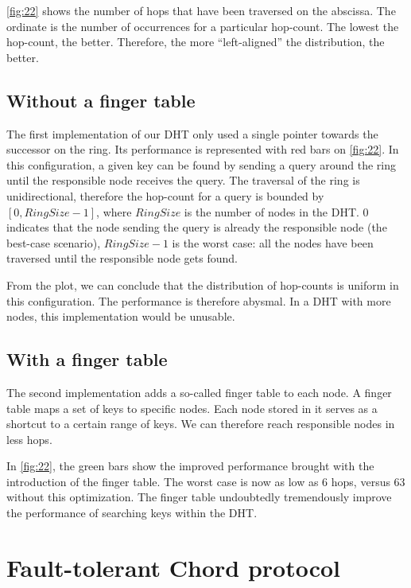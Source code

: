 \documentclass[11pt,a4paper,parskip=half]{scrartcl}
\begin{document}
\autoref{fig:22} shows the number of hops that have been traversed on the abscissa.
The ordinate is the number of occurrences for a particular hop-count.
The lowest the hop-count, the better.
Therefore, the more \enquote{left-aligned} the distribution, the better.

\subsection{Without a finger table}

The first implementation of our DHT only used a single pointer towards the successor on the ring.
Its performance is represented with red bars on \autoref{fig:22}.
In this configuration, a given key can be found by sending a query around the ring until the responsible node receives the query.
The traversal of the ring is unidirectional, therefore the hop-count for a query is bounded by $\left[0,RingSize-1\right]$, where $RingSize$ is the number of nodes in the DHT.
$0$ indicates that the node sending the query is already the responsible node (the best-case scenario), $RingSize-1$ is the worst case: all the nodes have been traversed until the responsible node gets found.

From the plot, we can conclude that the distribution of hop-counts is uniform in this configuration.
The performance is therefore abysmal.
In a DHT with more nodes, this implementation would be unusable.

\subsection{With a finger table}

The second implementation adds a so-called finger table to each node.
A finger table maps a set of keys to specific nodes.
Each node stored in it serves as a shortcut to a certain range of keys.
We can therefore reach responsible nodes in less hops.

In \autoref{fig:22}, the green bars show the improved performance brought with the introduction of the finger table.
The worst case is now as low as 6 hops, versus 63 without this optimization.
The finger table undoubtedly tremendously improve the performance of searching keys within the DHT.

\section{Fault-tolerant Chord protocol}
\end{document}
